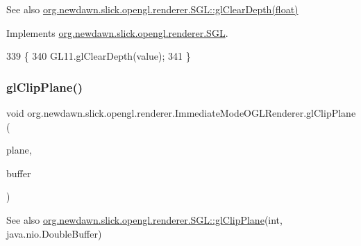 \begin{DoxySeeAlso}{See also}
\mbox{\hyperlink{interfaceorg_1_1newdawn_1_1slick_1_1opengl_1_1renderer_1_1_s_g_l_ab485cf2f4c743772ed5d24a66d7c1af3}{org.\+newdawn.\+slick.\+opengl.\+renderer.\+S\+G\+L\+::gl\+Clear\+Depth(float)}} 
\end{DoxySeeAlso}


Implements \mbox{\hyperlink{interfaceorg_1_1newdawn_1_1slick_1_1opengl_1_1renderer_1_1_s_g_l_ab485cf2f4c743772ed5d24a66d7c1af3}{org.\+newdawn.\+slick.\+opengl.\+renderer.\+S\+GL}}.


\begin{DoxyCode}
339                                           \{
340         GL11.glClearDepth(value);
341     \}
\end{DoxyCode}
\mbox{\label{classorg_1_1newdawn_1_1slick_1_1opengl_1_1renderer_1_1_immediate_mode_o_g_l_renderer_ac015ad8c26e5718b1e27910c8f09673c}} 
\subsubsection{\texorpdfstring{gl\+Clip\+Plane()}{glClipPlane()}}
{\footnotesize\ttfamily void org.\+newdawn.\+slick.\+opengl.\+renderer.\+Immediate\+Mode\+O\+G\+L\+Renderer.\+gl\+Clip\+Plane (\begin{DoxyParamCaption}\item[{int}]{plane,  }\item[{Double\+Buffer}]{buffer }\end{DoxyParamCaption})\hspace{0.3cm}{\ttfamily [inline]}}

\begin{DoxySeeAlso}{See also}
\mbox{\hyperlink{interfaceorg_1_1newdawn_1_1slick_1_1opengl_1_1renderer_1_1_s_g_l_aa0ecf8896be6f072c3d38372179071f8}{org.\+newdawn.\+slick.\+opengl.\+renderer.\+S\+G\+L\+::gl\+Clip\+Plane}}(int, java.\+nio.\+Double\+Buffer) 
\end{DoxySeeAlso}


